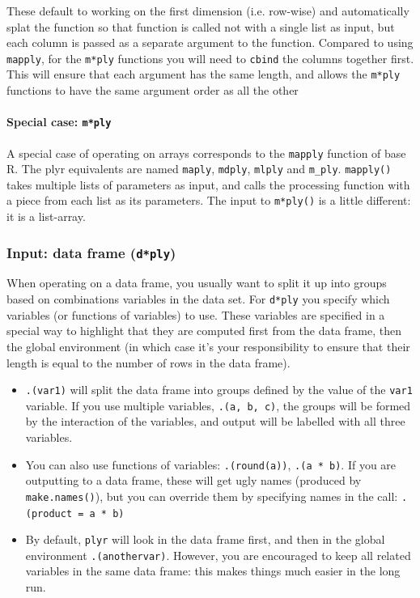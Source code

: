 \documentclass{scrartcl}
\newcommand{\code}[1]{\lstinline!#1!}
\newcommand{\f}[1]{\lstinline!#1()!}
\newcommand{\plyr}{{\tt plyr}\xspace}
\begin{document}
These default to working on the first dimension (i.e. row-wise) and automatically splat the function so that function is called not with a single list as input, but each column is passed as a separate argument to the function.  Compared to using {\tt mapply}, for the {\tt m*ply} functions you will need to {\tt cbind} the columns together first.  This will ensure that each argument has the same length, and allows the {\tt m*ply} functions to have the same argument order as all the other 

\paragraph{Special case: \code{m*ply}}  A special case of operating on arrays corresponds to the {\tt mapply} function of base R.  The plyr equivalents are named {\tt maply}, {\tt mdply}, {\tt mlply} and {\tt m\_ply}.  \f{mapply} takes multiple lists of parameters as input, and calls the processing function with a piece from each list as its parameters.  The input to \f{m*ply} is a little different: it is a list-array.


\subsubsection{Input: data frame ({\tt d*ply})}

When operating on a data frame, you usually want to split it up into groups based on combinations variables in the data set.  For {\tt d*ply} you specify   which variables (or functions of variables) to use.  These variables are specified in a special way to highlight that they are computed first from the data frame, then the global environment (in which case it's your responsibility to ensure that their length is equal to the number of rows in the data frame).  

\begin{itemize}
  \item \code{.(var1)} will split the data frame into groups defined by the value of the \code{var1} variable.  If you use multiple variables, {\tt .(a, b, c)}, the groups will be formed by the interaction of the variables, and output will be labelled with all three variables.  
  
  \item You can also use functions of variables: {\tt .(round(a))}, {\tt .(a * b)}.  If you are outputting to a data frame, these will get ugly names (produced by \f{make.names}), but you can override them by specifying names in the call: \code{.(product = a * b)}
  
  \item By default, \plyr will look in the data frame first, and then in the global environment {\tt .(anothervar)}.  However, you are encouraged to keep all related variables in the same data frame: this makes things much easier in the long run.
  
\end{itemize}
\end{document}
